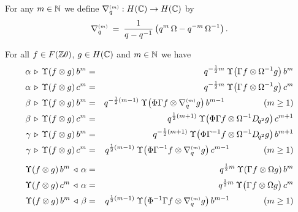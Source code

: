 \begin{defn*}
For any $m\in\mathbb{N}$ we define $\nabla_q^{\scriptscriptstyle (m)}: H(\mathbb{C}) \rightarrow H(\mathbb{C})$ by
\begin{equation} \label{eq:def:nabq}
 \nabq{m} \:=\: \frac{1}{q-q^{-1}}
        \left( q^m\, \Omega  - q^{-m}\, \Omega^{-1} \vertM\right).
\end{equation}
\end{defn*}


\begin{prop}  \label{prop:actions:Upsilon}
For all\/ $f\in F(\mathbb{Z} \theta)$, $g\in H(\mathbb{C})$ and\/ $m \in \mathbb{N}$ we have
\begin{eqnarray*}
  \alpha \,\lact \, \Upsilon(f \tens g)\, b^m
     &=& q^{-\frac{1}{2}m}\: \Upsilon \!\left(\Gamma f \tens \Omega^{-1} g \vertM\right) b^m
  \\  \vertL
  \alpha \,\lact \, \Upsilon(f \tens g)\, c^m
     &=& q^{-\frac{1}{2}m}\: \Upsilon \!\left(\Gamma f \tens \Omega^{-1} g \vertM\right) c^m
  \\
  \vertL
  \beta \,\lact \, \Upsilon(f \tens g)\, b^m
     &=& q^{-\frac{1}{2}(m-1)}\:
         \Upsilon \!\left(\Phi\Gamma f \tens \nabq{m} g \vertM\right) b^{m-1}
     \hspace{16mm} (m\geq 1)
  \\  \vertL
  \beta \,\lact \, \Upsilon(f \tens g)\, c^m
     &=& q^{\frac{1}{2}(m+1)}\:
         \Upsilon \!\left(\Phi\Gamma f \tens \Omega^{-1} \Dqsqr g \vertM\right) c^{m+1}
  \\
  \vertL
  \gamma \,\lact \, \Upsilon(f \tens g)\, b^m
     &=& q^{-\frac{1}{2}(m+1)}\:
         \Upsilon \!\left(\Phi\Gamma^{-1} f \tens \Omega^{-1} \Dqsqr g \vertM\right) b^{m+1}
  \\ \vertL
  \gamma \,\lact \, \Upsilon(f \tens g)\, c^m
     &=& q^{\frac{1}{2}(m-1)}\:
         \Upsilon \!\left(\Phi\Gamma^{-1} f \tens \nabq{m} g \vertM\right) c^{m-1}
     \hspace{14mm} (m\geq 1)
  \\
  \vertXL
  \Upsilon(f \tens g)\, b^m \, \ract \, \alpha
     &=& q^{\frac{1}{2}m}\: \Upsilon(\Gamma f \tens \Omega g)\, b^m
  \\  \vertL
   \Upsilon(f \tens g)\, c^m \, \ract \,\alpha
     &=& q^{\frac{1}{2}m}\: \Upsilon \!\left(\Gamma f \tens \Omega g \vertM\right) c^m
  \\
  \vertL
  \Upsilon(f \tens g)\, b^m \, \ract \,\beta
     &=& q^{\frac{1}{2}(m-1)}\:
         \Upsilon \!\left(\Phi^{-1}\Gamma f \tens \nabq{m} g \vertM\right) b^{m-1}
     \hspace{14mm} (m\geq 1)

\end{eqnarray*}
\end{prop}
